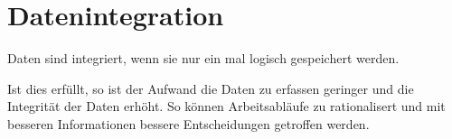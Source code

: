 \documentclass{article}
\begin{document}
\section{Datenintegration}
Daten sind integriert, wenn sie nur ein mal logisch gespeichert werden.

Ist dies erfüllt, so ist der Aufwand die Daten zu erfassen geringer und die Integrität der Daten erhöht. So können Arbeitsabläufe zu rationalisert und mit besseren Informationen bessere Entscheidungen getroffen werden.
\end{document}
